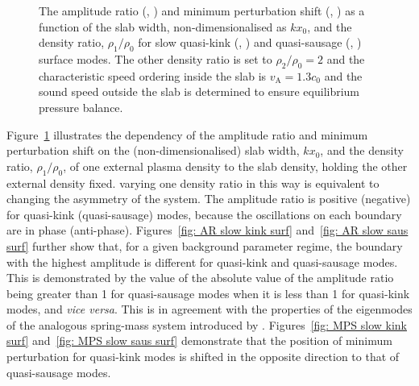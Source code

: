 \documentclass[namedreferences]{solarphysics}
\numberwithin{equation}{section}
\begin{document}
\begin{article}
\begin{figure}
{\label{fig: MPS slow kink surf}}
\caption{The amplitude ratio (\protect{}, \protect{}) and minimum perturbation shift (\protect{}, \protect{}) as a function of the slab width, non-dimensionalised as $kx_0$, and the density ratio, $\rho_1/\rho_0$ for slow quasi-kink (\protect{}, \protect{}) and quasi-sausage (\protect{}, \protect{}) surface modes. The other density ratio is set to $\rho_2/\rho_0 = 2$ and the characteristic speed ordering inside the slab is $v_\textrm{A}=1.3c_0$ and the sound speed outside the slab is determined to ensure equilibrium pressure balance.}
\label{fig: AR MPS}
\end{figure}

Figure~\ref{fig: AR MPS} illustrates the dependency of the amplitude ratio and minimum perturbation shift on the (non-dimensionalised) slab width, $kx_0$, and the density ratio, $\rho_1/\rho_0$, of one external plasma density to the slab density, holding the other external density fixed. varying one density ratio in this way is equivalent to changing the asymmetry of the system. The amplitude ratio is positive (negative) for quasi-kink (quasi-sausage) modes, because the oscillations on each boundary are in phase (anti-phase). Figures~\ref{fig: AR slow kink surf} and~\ref{fig: AR slow saus surf} further show that, for a given background parameter regime, the boundary with the highest amplitude is different for quasi-kink and quasi-sausage modes. This is demonstrated by the value of the absolute value of the amplitude ratio being greater than 1 for quasi-sausage modes when it is less than 1 for quasi-kink modes, and \textit{vice versa}. This is in agreement with the properties of the eigenmodes of the analogous spring-mass system introduced by \cite{all_etal17}. Figures~\ref{fig: MPS slow kink surf} and~\ref{fig: MPS slow saus surf} demonstrate that the position of minimum perturbation for quasi-kink modes is shifted in the opposite direction to that of quasi-sausage modes.


\end{article}
\end{document}
